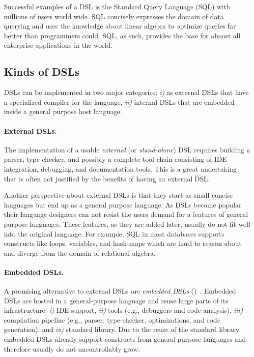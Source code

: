 Successful examples of a DSL is the Standard Query Language (SQL) with millions of users world wide.
 SQL concisely expresses the domain of data querying and uses the knowledge about linear algebra
 to optimize queries far better than programmers could. SQL, as such, provides the base for almost all
 enterprise applications in the world.

\subsection{Kinds of DSLs}
\label{sec:kinds-of-dsls}

DSLs can be implemented in two major categories: \emph{i)} as external DSLs that
 have a specialized compiler for the language, \emph{ii)} internal DSLs that are
 embedded inside a general purpose host language.

\paragraph{External DSLs.} The implementation of a usable \emph{external}
(or \emph{stand-alone}) DSL requires building a parser, type-checker, and possibly a complete
tool chain consisting of IDE integration, debugging, and documentation
tools. This is a great undertaking that is often not justified by the
benefits of having an external DSL.

Another perspective about external DSLs is that they start as small concise languages but
 end up as a general purpose language. As DSLs become popular their  language designers
 can not resist the users demand for a features of general purpose languages. These features,
 as they are added later, usually do not fit well into the original language.
 For example, SQL in most databases supports constructs like loops, variables,
 and hash-maps which are hard to reason about and diverge from the domain of
 relational algebra.

\paragraph{Embedded DSLs.} A promising alternative to external DSLs are \emph{embedded DSLs} (\edsls)~\cite{Hudak96csur}. Embedded DSLs
are hosted in a general-purpose language and reuse large parts of its
infrastructure: \emph{i)} IDE support, \emph{ii)} tools (e.g., debuggers and code analysis), \emph{iii)} compilation pipeline (e.g.,
 parser, type-checker, optimizations, and code generation), and \emph{iv)} standard library. Due to
 the reuse of the standard library embedded DSLs already support constructs from general purpose languages and
 therefore usually do not uncontrollably grow.

